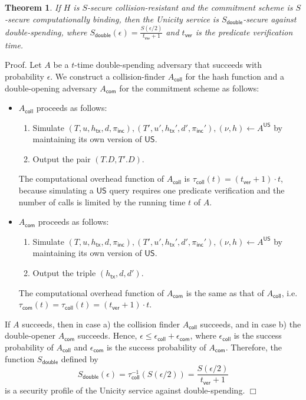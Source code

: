 \documentclass{article}
\newtheorem{theorem}{Theorem}[section]
\newenvironment{proof}{\textsf{Proof}.}{\hfill$\Box$}
\newcommand{\unisrv}[0]{\mathsf{US}}
\newcommand{\txhash}[0]{h_\mathsf{tx}}
\newcommand{\pinc}[0]{\pi_{\mathsf{inc}}}
\newcommand{\predi}[0]{\nu}
\begin{document}
\begin{theorem}
If $H$ is $S$-secure collision-resistant and the commitment scheme is $S$-secure computationally binding, then the Unicity service is $S_\mathsf{double}$-secure against double-spending, where
$S_\mathsf{double}(\epsilon) = \frac{S(\epsilon/2)}{t_\mathsf{ver}+1}$
and $t_\mathsf{ver}$ is the predicate verification time.
\end{theorem}
\begin{proof}
Let $A$ be a $t$-time double-spending adversary that succeeds with probability $\epsilon$. We construct a collision-finder $A_\mathsf{coll}$ for the hash function and a double-opening adversary $A_\mathsf{com}$ for the commitment scheme as follows:
\begin{itemize}
\item $A_\mathsf{coll}$ proceeds as follows:
\begin{enumerate}
\item Simulate $(T,u,\txhash,d,\pinc),(T',u',\txhash',d',\pinc'),(\predi,h)\gets A^\unisrv$ by maintaining its own version of $\unisrv$.
\item Output the pair $(T.D,T'.D)$.
\end{enumerate}
The computational overhead function of $A_\mathsf{coll}$ is $\tau_\mathsf{coll}(t) = (t_\mathsf{ver}+1) \cdot t$, because simulating a $\unisrv$ query requires one predicate verification and the number of calls is limited by the running time $t$ of $A$.
\item $A_\mathsf{com}$ proceeds as follows:
\begin{enumerate}
\item Simulate $(T,u,\txhash,d,\pinc),(T',u',\txhash',d',\pinc'),(\predi,h)\gets A^\unisrv$ by maintaining its own version of $\unisrv$.
\item Output the triple $(\txhash,d,d')$.
\end{enumerate}
The computational overhead function of $A_\mathsf{com}$ is the same as
that of $A_\mathsf{coll}$, i.e. $\tau_\mathsf{com}(t)= \tau_\mathsf{coll}(t)=(t_\mathsf{ver}+1) \cdot t$.
\end{itemize}
 If $A$ succeeds, then in case a) the collision finder $A_\mathsf{coll}$ succeeds, and in case b) the double-opener $A_\mathsf{com}$ succeeds. Hence, $\epsilon \le \epsilon_\mathsf{coll} + \epsilon_\mathsf{com}$, where $\epsilon_\mathsf{coll}$ is the success probability of $A_\mathsf{coll}$ and
$\epsilon_\mathsf{com}$ is the success probability of $A_\mathsf{com}$.
Therefore, the function $S_\mathsf{double}$ defined by
\[
S_\mathsf{double}(\epsilon) = \tau^{-1}_\mathsf{coll}(S(\epsilon/2)) =
\frac{S(\epsilon/2)}{t_\mathsf{ver}+1}
\]
is a security profile of the Unicity service against double-spending.
\end{proof}
\end{document}
